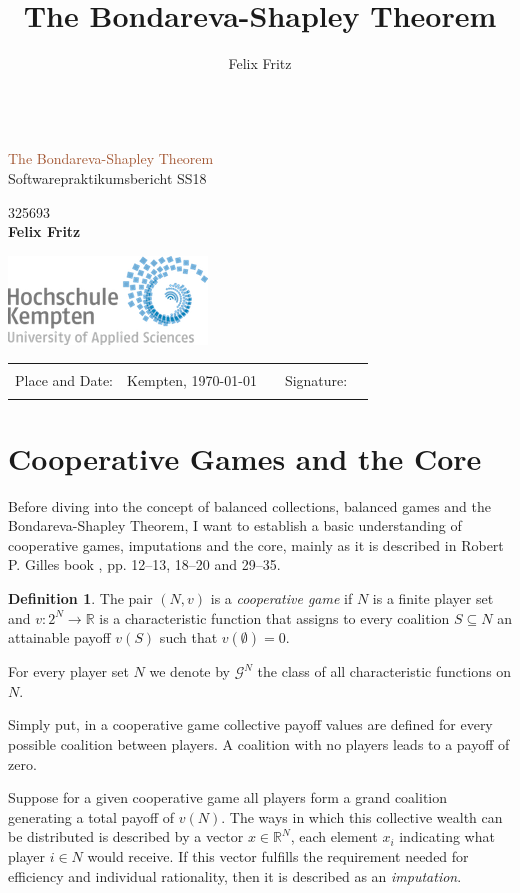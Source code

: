 \documentclass[10pt,a4paper,titlepage]{article}
\author{Felix Fritz}
\title{The Bondareva-Shapley Theorem}
\newcommand*{\plogo}{\includegraphics{logo_s}}
\newcommand*{\rotrt}[1]{\rotatebox{90}{#1}} %
\newcommand*{\rotlft}[1]{\rotatebox{-90}{#1}} %
\newcommand*{\titleBC}{\begingroup %
    \centering %

    \def\CP{{\fontsize{30}{48} \selectfont The Bondareva-Shapley Theorem}} %

    \settowidth{\unitlength}{\fontsize{30}{48} \selectfont The Bondareva-Shapley}
    {\color{Brown}\resizebox*{\unitlength}{\baselineskip}{\rotrt{$\}$}}} \\[\baselineskip] %
    \textcolor{Sienna}{\CP} \\[\baselineskip] %
    {\color{Sienna}\Large Softwarepraktikumsbericht SS18} \\ %
    {\color{Brown}\resizebox*{\unitlength}{\baselineskip}{\rotlft{$\}$}}} %

    \vfill %

    {\large 325693}\\[4pt]
    {\Large\textbf{Felix Fritz}}\\[9pt]\vfill

    \vfill %
    \plogo\\[0.5\baselineskip] %

    \vfill
    \begin{tabular}{llp{1cm}ll}
        \hspace{-20pt}Place and Date: & Kempten, \today & &
        Signature: & \rule{4cm}{1pt} \\
    \end{tabular}

    

\endgroup}
\theoremstyle{plain}
\theoremstyle{definition}
\newtheorem{definition}[thm]{Definition} %
\begin{document}

\pagestyle{empty}
\titleBC
\pagebreak

\pagestyle{plain}
\tableofcontents
\pagebreak


\section{Cooperative Games and the Core}
Before diving into the concept of balanced collections, balanced games and the Bondareva-Shapley Theorem, I want to establish a basic understanding of cooperative games, imputations and the core, mainly as it is described in Robert P. Gilles book \cite{gilles}, pp. 12--13, 18--20 and 29--35.

\begin{definition}
    The pair $(N, v)$ is a \textit{cooperative game} if $N$ is a finite player set and $v: 2^N \rightarrow \mathbb{R}$ is a characteristic function that assigns to every coalition $S \subseteq N$ an attainable payoff $v(S)$ such that $v(\emptyset) = 0$.
    
    For every player set $N$ we denote by $\mathcal{G}^N$ the class of all characteristic functions on $N$.
\end{definition}
Simply put, in a cooperative game collective payoff values are defined for every possible coalition between players. A coalition with no players leads to a payoff of zero.

Suppose for a given cooperative game all players form a grand coalition generating a total payoff of $v(N)$. The ways in which this collective wealth can be distributed is described by a vector $x \in \mathbb{R}^N$, each element $x_i$ indicating what player $i \in N$ would receive.
If this vector fulfills the requirement needed for efficiency and individual rationality, then it is described as an \textit{imputation}.
\end{document}
